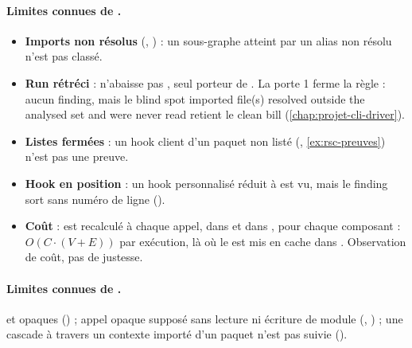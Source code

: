 \paragraph{Limites connues de .}
\begin{itemize}
  \item \textbf{Imports non résolus} (, ) : un sous-graphe atteint par
        un alias non résolu n'est pas classé.
  \item \textbf{Run rétréci} :  n'abaisse
        pas , seul porteur de . La porte 1 ferme la règle :
        aucun finding, mais le blind spot  imported file(s) resolved outside the analysed set
        and were never read\fg{} retient le \og clean bill\fg{} (\cref{chap:projet-cli-driver}).
  \item \textbf{Listes fermées} : un hook client d'un paquet non listé (,
        \cref{ex:rsc-preuves}) n'est pas une preuve.
  \item \textbf{Hook en position } : un hook personnalisé réduit à
         est vu, mais le finding sort sans numéro de ligne ().
  \item \textbf{Coût} :  est recalculé à chaque appel, dans  et
        dans , pour chaque composant : $O(C \cdot (V+E))$ par exécution, là où
        le  est mis en cache dans . Observation de coût, pas
        de justesse.
\end{itemize}

\paragraph{Limites connues de .}  et 
opaques () ; appel opaque supposé sans lecture ni écriture de module (,
) ; une cascade à travers un contexte importé d'un paquet n'est pas suivie
().

